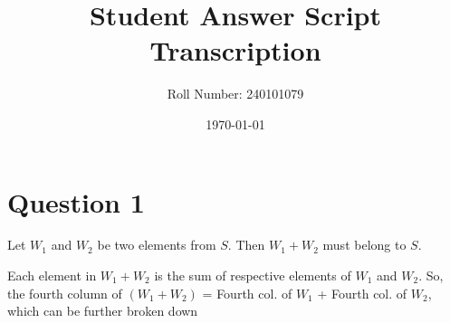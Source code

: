\documentclass[12pt]{article}
\title{Student Answer Script Transcription}
\author{Roll Number: 240101079}
\date{\today}
\begin{document}
\maketitle

\section*{Question 1}

Let $W_{1}$ and $W_{2}$ be two elements from $S$. Then $W_{1} + W_{2}$ must belong to $S$.

Each element in $W_{1} + W_{2}$ is the sum of respective elements of $W_{1}$ and $W_{2}$. So, the fourth column of $(W_{1} + W_{2})$ = Fourth col. of $W_{1}$ + Fourth col. of $W_{2}$, which can be further broken down
\end{document}
